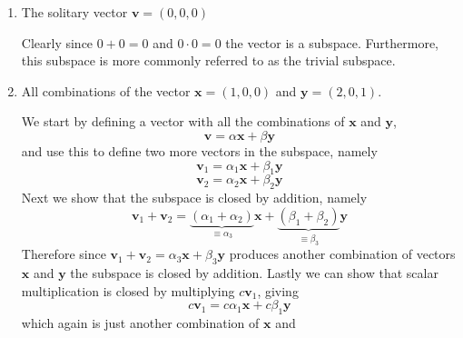 \begin{enumerate}[label=(\arabic*)]
    \item 
        The solitary vector $\mathbf{v}=(0,0,0)$
        \newline
        \begin{mdframed}[style=MyFrame]
            Clearly since $0+0=0$ and $0\cdot0=0$ the vector is a subspace.
            Furthermore, this subspace is more commonly referred to as the
            trivial subspace.
        \end{mdframed}
    \item 
        All combinations of the vector $\mathbf{x} =(1,0,0)$ and
        $\mathbf{y}=(2,0,1)$.
        \begin{mdframed}[style=MyFrame]
            We start by defining a vector with all the combinations of
            $\mathbf{x}$ and $\mathbf{y}$,
            \begin{equation}
                \mathbf{v} = \alpha \mathbf{x} + \beta \mathbf{y}
            \end{equation}
            and use this to define two more vectors in the subspace, namely
            \begin{equation}
                \mathbf{v}_{1} = \alpha_{1} \mathbf{x} + \beta_{1} \mathbf{y}
            \end{equation}
            \begin{equation}
                \mathbf{v}_{2} = \alpha_{2} \mathbf{x} + \beta_{2} \mathbf{y}
            \end{equation}
            Next we show that the subspace is closed by addition, namely
            \begin{equation}
                \mathbf{v}_{1} + \mathbf{v}_{2} = 
                        \underbrace{(\alpha_{1} + \alpha_{2})}_{\equiv \alpha_{3}} \mathbf{x} +
                        \underbrace{(\beta_{1} + \beta_{2})}_{\equiv \beta_{3}} \mathbf{y}
            \end{equation}
            Therefore since  
            $\mathbf{v}_{1} + \mathbf{v}_{2} = \alpha_{3}\mathbf{x} + \beta_{3} \mathbf{y}$ 
            produces another combination of vectors $\mathbf{x}$ and
            $\mathbf{y}$ the subspace is closed by addition.
            Lastly we can show that scalar multiplication is closed by
            multiplying $c\mathbf{v}_{1}$, giving
            \begin{equation}
                c\mathbf{v}_{1} = c\alpha_{1} \mathbf{x} + c\beta_{1} \mathbf{y}
            \end{equation}
            which again is just another combination of $\mathbf{x}$ and

\end{mdframed}
\end{enumerate}

